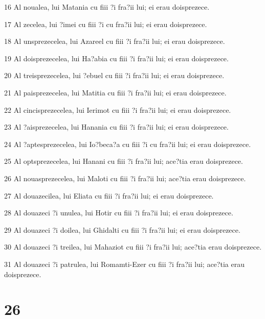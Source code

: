 \par 16 Al noualea, lui Matania cu fiii ?i fra?ii lui; ei erau doisprezece.
\par 17 Al zecelea, lui ?imei cu fiii ?i cu fra?ii lui; ei erau doisprezece.
\par 18 Al unsprezecelea, lui Azareel cu fiii ?i fra?ii lui; ei erau doisprezece.
\par 19 Al doisprezecelea, lui Ha?abia cu fiii ?i fra?ii lui; ei erau doisprezece.
\par 20 Al treisprezecelea, lui ?ebuel cu fiii ?i fra?ii lui; ei erau doisprezece.
\par 21 Al paisprezecelea, lui Matitia cu fiii ?i fra?ii lui; ei erau doisprezece.
\par 22 Al cincisprezecelea, lui Ierimot cu fiii ?i fra?ii lui; ei erau doisprezece.
\par 23 Al ?aisprezecelea, lui Hanania cu fiii ?i fra?ii lui; ei erau doisprezece.
\par 24 Al ?aptesprezecelea, lui Io?beca?a cu fiii ?i cu fra?ii lui; ei erau doisprezece.
\par 25 Al optsprezecelea, lui Hanani cu fiii ?i fra?ii lui; ace?tia erau doisprezece.
\par 26 Al nouasprezecelea, lui Maloti cu fiii ?i fra?ii lui; ace?tia erau doisprezece.
\par 27 Al douazecilea, lui Eliata cu fiii ?i fra?ii lui; ei erau doisprezece.
\par 28 Al douazeci ?i unulea, lui Hotir cu fiii ?i fra?ii lui; ei erau doisprezece.
\par 29 Al douazeci ?i doilea, lui Ghidalti cu fiii ?i fra?ii lui; ei erau doisprezece.
\par 30 Al douazeci ?i treilea, lui Mahaziot cu fiii ?i fra?ii lui; ace?tia erau doisprezece.
\par 31 Al douazeci ?i patrulea, lui Romamti-Ezer cu fiii ?i fra?ii lui; ace?tia erau doisprezece.

\chapter{26}

